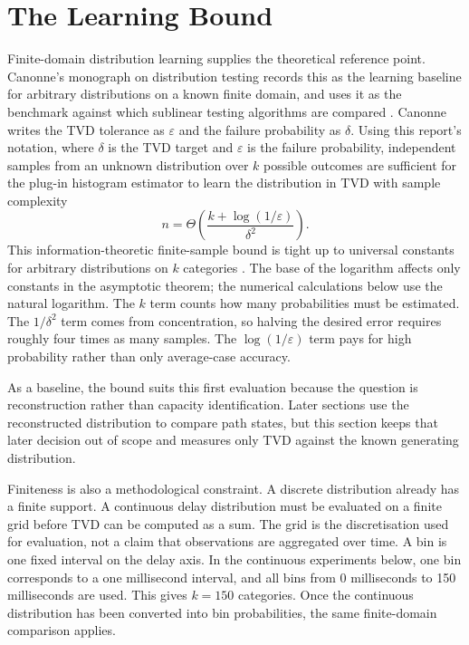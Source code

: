\documentclass[a4paper,11pt]{report}
\begin{document}
\section{The Learning Bound}

Finite-domain distribution learning supplies the theoretical reference point. Canonne's monograph on distribution testing records this as the learning baseline for arbitrary distributions on a known finite domain, and uses it as the benchmark against which sublinear testing algorithms are compared \cite{canonneTopics}. Canonne writes the TVD tolerance as \(\varepsilon\) and the failure probability as \(\delta\). Using this report's notation, where \(\delta\) is the TVD target and \(\varepsilon\) is the failure probability, independent samples from an unknown distribution over \(k\) possible outcomes are sufficient for the plug-in histogram estimator to learn the distribution in TVD with sample complexity
\[
n = \Theta\left(\frac{k+\log(1/\varepsilon)}{\delta^2}\right).
\]
This information-theoretic finite-sample bound is tight up to universal constants for arbitrary distributions on \(k\) categories \cite{canonneShort,canonneTopics,devroyeLugosi}. The base of the logarithm affects only constants in the asymptotic theorem; the numerical calculations below use the natural logarithm. The \(k\) term counts how many probabilities must be estimated. The \(1/\delta^2\) term comes from concentration, so halving the desired error requires roughly four times as many samples. The \(\log(1/\varepsilon)\) term pays for high probability rather than only average-case accuracy.

As a baseline, the bound suits this first evaluation because the question is reconstruction rather than capacity identification. Later sections use the reconstructed distribution to compare path states, but this section keeps that later decision out of scope and measures only TVD against the known generating distribution.

Finiteness is also a methodological constraint. A discrete distribution already has a finite support. A continuous delay distribution must be evaluated on a finite grid before TVD can be computed as a sum. The grid is the discretisation used for evaluation, not a claim that observations are aggregated over time. A bin is one fixed interval on the delay axis. In the continuous experiments below, one bin corresponds to a one millisecond interval, and all bins from 0 milliseconds to 150 milliseconds are used. This gives \(k=150\) categories. Once the continuous distribution has been converted into bin probabilities, the same finite-domain comparison applies.
\end{document}
